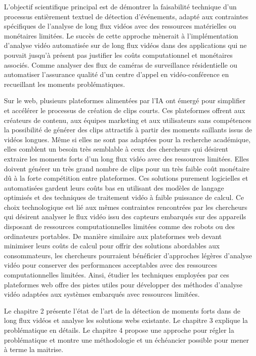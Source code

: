 \documentclass[livre]{udes-genie-these}
\begin{document}
L'objectif scientifique principal est de démontrer la faisabilité technique d'un processus entièrement textuel de détection d'événements, adapté aux contraintes spécifiques de l’analyse de long flux vidéos avec des ressources matérielles ou monétaires limitées. Le succès de cette approche mènerait à l’implémentation d’analyse vidéo automatisée sur de long flux vidéos dans des applications qui ne pouvait jusqu’à présent pas justifier les coûts computationnel et monétaires associés. Comme analyser des flux de caméras de surveillance résidentielle ou automatiser l’assurance qualité d’un centre d’appel en vidéo-conférence en recueillant les moments problématiques.

Sur le web, plusieurs plateformes alimentées par l’IA ont émergé pour simplifier et accélérer le processus de création de clips courts. Ces plateformes offrent aux créateurs de contenu, aux équipes marketing et aux utilisateurs sans compétences la possibilité de générer des clips attractifs à partir des moments saillants issus de vidéos longues. Même si elles ne sont pas adaptées pour la recherche académique, elles comblent un besoin très semblable à ceux des chercheurs qui désirent extraire les moments forts d’un long flux vidéo avec des ressources limitées. Elles doivent générer un très grand nombre de clips pour un très faible coût monétaire dû à la forte compétition entre plateformes. Ces solutions purement logicielles et automatisées gardent leurs coûts bas en utilisant des modèles de langage optimisés et des techniques de traitement vidéo à faible puissance de calcul. Ce choix technologique est lié aux mêmes contraintes rencontrées par les chercheurs qui désirent analyser le flux vidéo issu des capteurs embarqués sur des appareils disposant de ressources computationnelles limitées comme des robots ou des ordinateurs portables. De manière similaire aux plateformes web devant minimiser leurs coûts de calcul pour offrir des solutions abordables aux consommateurs, les chercheurs pourraient bénéficier d'approches légères d’analyse vidéo pour conserver des performances acceptables avec des ressources computationnelles limitées. Ainsi, étudier les techniques employées par ces plateformes web offre des pistes utiles pour développer des méthodes d'analyse vidéo adaptées aux systèmes embarqués avec ressources limitées.

Le chapitre 2 présente l’état de l’art de la détection de moments forts dans de long flux vidéos et analyse les solutions webs existante. 
Le chapitre 3 explique la problématique en détails. 
Le chapitre 4 propose une approche pour régler la problématique et montre une méthodologie et un échéancier possible pour mener à terme la maitrise.
\end{document}
